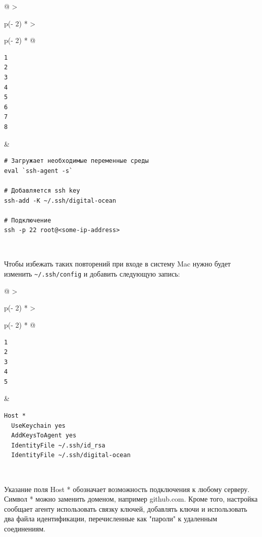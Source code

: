 \documentclass{article}
\begin{document}
\begin{longtable}[]{@{}
  >{\raggedright\arraybackslash}p{(\columnwidth - 2\tabcolsep) * }
  >{\raggedright\arraybackslash}p{(\columnwidth - 2\tabcolsep) * }@{}}
\toprule
\endhead
\begin{minipage}[t]{\linewidth}\raggedright
\begin{verbatim}
1
2
3
4
5
6
7
8
\end{verbatim}
\end{minipage} & \begin{minipage}[t]{\linewidth}\raggedright
\begin{verbatim}
# Загружает необходимые переменные среды
eval `ssh-agent -s`

# Добавляется ssh key
ssh-add -K ~/.ssh/digital-ocean

# Подключение
ssh -p 22 root@<some-ip-address>
\end{verbatim}
\end{minipage} \\ \addlinespace
\bottomrule
\end{longtable}

Чтобы избежать таких повторений при входе в систему Mac нужно будет
изменить \texttt{\textasciitilde{}/.ssh/config} и добавить следующую
запись:

\begin{longtable}[]{@{}
  >{\raggedright\arraybackslash}p{(\columnwidth - 2\tabcolsep) * }
  >{\raggedright\arraybackslash}p{(\columnwidth - 2\tabcolsep) * }@{}}
\toprule
\endhead
\begin{minipage}[t]{\linewidth}\raggedright
\begin{verbatim}
1
2
3
4
5
\end{verbatim}
\end{minipage} & \begin{minipage}[t]{\linewidth}\raggedright
\begin{verbatim}
Host *
  UseKeychain yes
  AddKeysToAgent yes
  IdentityFile ~/.ssh/id_rsa
  IdentityFile ~/.ssh/digital-ocean
\end{verbatim}
\end{minipage} \\ \addlinespace
\bottomrule
\end{longtable}

Указание поля Host * обозначает возможность подключения к любому
серверу. Символ * можно заменить доменом, например github.com. Кроме
того, настройка сообщает агенту использовать связку ключей, добавлять
ключи и использовать два файла идентификации, перечисленные как "пароли"
к удаленным соединениям.
\end{document}
